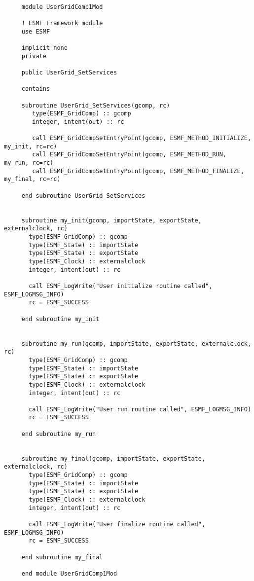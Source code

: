   
  \begin{verbatim}
 
     module UserGridComp1Mod
     
     ! ESMF Framework module
     use ESMF
     
     implicit none
     private
     
     public UserGrid_SetServices
 
     contains
 
     subroutine UserGrid_SetServices(gcomp, rc)
        type(ESMF_GridComp) :: gcomp
        integer, intent(out) :: rc
 
        call ESMF_GridCompSetEntryPoint(gcomp, ESMF_METHOD_INITIALIZE, my_init, rc=rc)
        call ESMF_GridCompSetEntryPoint(gcomp, ESMF_METHOD_RUN, my_run, rc=rc)
        call ESMF_GridCompSetEntryPoint(gcomp, ESMF_METHOD_FINALIZE, my_final, rc=rc)
 
     end subroutine UserGrid_SetServices
 
 
     subroutine my_init(gcomp, importState, exportState, externalclock, rc)
       type(ESMF_GridComp) :: gcomp
       type(ESMF_State) :: importState
       type(ESMF_State) :: exportState
       type(ESMF_Clock) :: externalclock
       integer, intent(out) :: rc
      
       call ESMF_LogWrite("User initialize routine called", ESMF_LOGMSG_INFO)
       rc = ESMF_SUCCESS
 
     end subroutine my_init
 
 
     subroutine my_run(gcomp, importState, exportState, externalclock, rc)
       type(ESMF_GridComp) :: gcomp
       type(ESMF_State) :: importState
       type(ESMF_State) :: exportState
       type(ESMF_Clock) :: externalclock
       integer, intent(out) :: rc
      
       call ESMF_LogWrite("User run routine called", ESMF_LOGMSG_INFO)
       rc = ESMF_SUCCESS
 
     end subroutine my_run
 
 
     subroutine my_final(gcomp, importState, exportState, externalclock, rc)
       type(ESMF_GridComp) :: gcomp
       type(ESMF_State) :: importState
       type(ESMF_State) :: exportState
       type(ESMF_Clock) :: externalclock
       integer, intent(out) :: rc
      
       call ESMF_LogWrite("User finalize routine called", ESMF_LOGMSG_INFO)
       rc = ESMF_SUCCESS
 
     end subroutine my_final
 
     end module UserGridComp1Mod
 
  \end{verbatim}
     
\setlength{\parskip}{\oldparskip}
\setlength{\parindent}{\oldparindent}
\setlength{\baselineskip}{\oldbaselineskip}
